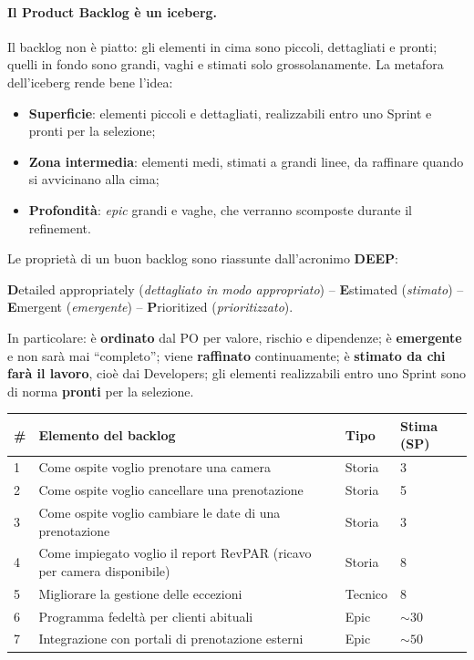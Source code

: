 \documentclass[12pt]{extarticle}
\begin{document}
\paragraph{Il Product Backlog è un iceberg.}
Il backlog non è piatto: gli elementi in cima sono piccoli, dettagliati e pronti; quelli in fondo sono grandi, vaghi e stimati solo grossolanamente. La metafora dell'iceberg rende bene l'idea:
\begin{itemize}
    \item \textbf{Superficie}: elementi piccoli e dettagliati, realizzabili entro uno Sprint e pronti per la selezione;
    \item \textbf{Zona intermedia}: elementi medi, stimati a grandi linee, da raffinare quando si avvicinano alla cima;
    \item \textbf{Profondità}: \textit{epic} grandi e vaghe, che verranno scomposte durante il refinement.
\end{itemize}
\noindent Le proprietà di un buon backlog sono riassunte dall'acronimo \textbf{DEEP}:
\begin{center}
\textbf{D}etailed appropriately (\textit{dettagliato in modo appropriato}) \quad -- \quad \textbf{E}stimated (\textit{stimato}) \quad -- \quad \textbf{E}mergent (\textit{emergente}) \quad -- \quad \textbf{P}rioritized (\textit{prioritizzato}).
\end{center}
\noindent In particolare: è \textbf{ordinato} dal PO per valore, rischio e dipendenze; è \textbf{emergente} e non sarà mai ``completo''; viene \textbf{raffinato} continuamente; è \textbf{stimato da chi farà il lavoro}, cioè dai Developers; gli elementi realizzabili entro uno Sprint sono di norma \textbf{pronti} per la selezione.

\begin{center}
\small
\begin{tabular}{p{0.8cm}p{8.2cm}p{2.6cm}p{2.2cm}}
    \toprule
    \textbf{\#} & \textbf{Elemento del backlog} & \textbf{Tipo} & \textbf{Stima (SP)} \\
    \midrule
    1 & Come ospite voglio prenotare una camera & Storia & 3 \\
    2 & Come ospite voglio cancellare una prenotazione & Storia & 5 \\
    3 & Come ospite voglio cambiare le date di una prenotazione & Storia & 3 \\
    4 & Come impiegato voglio il report RevPAR (ricavo per camera disponibile) & Storia & 8 \\
    5 & Migliorare la gestione delle eccezioni & Tecnico & 8 \\
    6 & Programma fedeltà per clienti abituali & Epic & $\sim 30$ \\
    7 & Integrazione con portali di prenotazione esterni & Epic & $\sim 50$ \\
    \bottomrule
\end{tabular}
\end{center}
\end{document}
